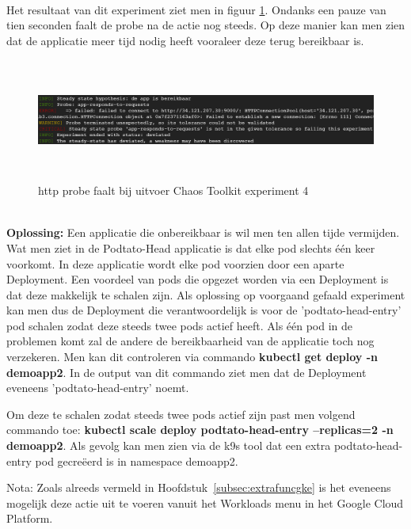 \\ \newline Het resultaat van dit experiment ziet men in figuur \ref{img:chaostoolkitex4}. Ondanks een pauze van tien seconden faalt de probe na de actie nog steeds. Op deze manier kan men zien dat de applicatie meer tijd nodig heeft vooraleer deze terug bereikbaar is.

\begin{figure}[h]
    \centering
    \includegraphics[width=15cm, height=4cm]{img/chaostoolkit-ex4.png}
    \caption{http probe faalt bij uitvoer Chaos Toolkit experiment 4}
    \label{img:chaostoolkitex4}
\end{figure}

\\ {\bf Oplossing:} Een applicatie die onbereikbaar is wil men ten allen tijde vermijden. Wat men ziet in de Podtato-Head applicatie is dat elke pod slechts één keer voorkomt. In deze applicatie wordt elke pod voorzien door een aparte Deployment. 
\newline Een voordeel van pods die opgezet worden via een Deployment is dat deze makkelijk te schalen zijn.
Als oplossing op voorgaand gefaald experiment kan men dus de Deployment die verantwoordelijk is voor de 'podtato-head-entry' pod schalen zodat deze steeds twee pods actief heeft. Als één pod in de problemen komt zal de andere de bereikbaarheid van de applicatie toch nog verzekeren. 
Men kan dit controleren via commando {\bf kubectl get deploy -n demoapp2}. In de output van dit commando ziet men dat de Deployment eveneens 'podtato-head-entry' noemt. 

Om deze te schalen zodat steeds twee pods actief zijn past men volgend commando toe: {\bf kubectl scale deploy podtato-head-entry --replicas=2 -n demoapp2}. Als gevolg kan men zien via de k9s tool dat een extra podtato-head-entry pod gecreëerd is in namespace demoapp2.

Nota: Zoals alreeds vermeld in Hoofdstuk~\ref{subsec:extrafuncgke} is het eveneens mogelijk deze actie uit te voeren vanuit het Workloads menu in het Google Cloud Platform. 

